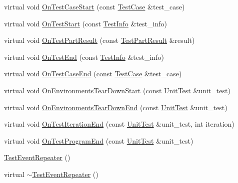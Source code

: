 \begin{DoxyCompactItemize}
\item 
virtual void \hyperlink{classtesting_1_1internal_1_1_test_event_repeater_a70124c738caa338bcd723eb2a51c8b3e}{On\-Test\-Case\-Start} (const \hyperlink{classtesting_1_1_test_case}{Test\-Case} \&test\-\_\-case)
\item 
virtual void \hyperlink{classtesting_1_1internal_1_1_test_event_repeater_a70d694ca5010cc86cd458f7f529e6fbe}{On\-Test\-Start} (const \hyperlink{classtesting_1_1_test_info}{Test\-Info} \&test\-\_\-info)
\item 
virtual void \hyperlink{classtesting_1_1internal_1_1_test_event_repeater_ac8fb21da6802b1ebab9cad3eee9150eb}{On\-Test\-Part\-Result} (const \hyperlink{classtesting_1_1_test_part_result}{Test\-Part\-Result} \&result)
\item 
virtual void \hyperlink{classtesting_1_1internal_1_1_test_event_repeater_aa0f13bded9369aae1c78583d7276f8b1}{On\-Test\-End} (const \hyperlink{classtesting_1_1_test_info}{Test\-Info} \&test\-\_\-info)
\item 
virtual void \hyperlink{classtesting_1_1internal_1_1_test_event_repeater_a0a335e1c3957a8c699ed56e37ea7b978}{On\-Test\-Case\-End} (const \hyperlink{classtesting_1_1_test_case}{Test\-Case} \&test\-\_\-case)
\item 
virtual void \hyperlink{classtesting_1_1internal_1_1_test_event_repeater_a30db75df2d9a65d787f31e16004613c2}{On\-Environments\-Tear\-Down\-Start} (const \hyperlink{classtesting_1_1_unit_test}{Unit\-Test} \&unit\-\_\-test)
\item 
virtual void \hyperlink{classtesting_1_1internal_1_1_test_event_repeater_a8428220c4cf9f0cea2dfd9a70f07ab7f}{On\-Environments\-Tear\-Down\-End} (const \hyperlink{classtesting_1_1_unit_test}{Unit\-Test} \&unit\-\_\-test)
\item 
virtual void \hyperlink{classtesting_1_1internal_1_1_test_event_repeater_a94253e3c11753328e8a031f39352708f}{On\-Test\-Iteration\-End} (const \hyperlink{classtesting_1_1_unit_test}{Unit\-Test} \&unit\-\_\-test, int iteration)
\item 
virtual void \hyperlink{classtesting_1_1internal_1_1_test_event_repeater_a4622616259747dbcc23f5ee39ef99ec0}{On\-Test\-Program\-End} (const \hyperlink{classtesting_1_1_unit_test}{Unit\-Test} \&unit\-\_\-test)
\item 
\hyperlink{classtesting_1_1internal_1_1_test_event_repeater_a97dc3b08bd62c615f16e4c73ed0b3894}{Test\-Event\-Repeater} ()
\item 
virtual \hyperlink{classtesting_1_1internal_1_1_test_event_repeater_abec83146387ab79e0e14df2850f25ee3}{$\sim$\-Test\-Event\-Repeater} ()

\end{DoxyCompactItemize}
